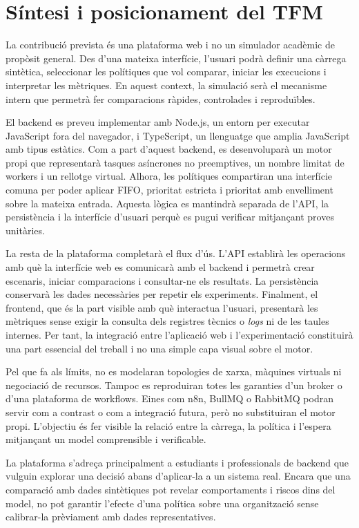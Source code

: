 \section{Síntesi i posicionament del TFM}

La contribució prevista és una plataforma web i no un simulador acadèmic de
propòsit general. Des d'una mateixa interfície, l'usuari podrà definir una
càrrega sintètica, seleccionar les polítiques que vol comparar, iniciar les
execucions i interpretar les mètriques. En aquest context, la simulació serà el
mecanisme intern que permetrà fer comparacions ràpides, controlades i
reproduïbles.

El backend es preveu implementar amb Node.js, un entorn per executar JavaScript
fora del navegador, i TypeScript, un llenguatge que amplia JavaScript amb tipus
estàtics. Com a part d'aquest backend, es desenvoluparà un motor propi que
representarà tasques asíncrones no preemptives, un nombre limitat de workers i
un rellotge virtual. Alhora, les polítiques compartiran una interfície comuna
per poder aplicar FIFO, prioritat estricta i prioritat amb envelliment sobre la
mateixa entrada. Aquesta lògica es mantindrà separada de l'API, la persistència
i la interfície d'usuari perquè es pugui verificar mitjançant proves unitàries.

La resta de la plataforma completarà el flux d'ús. L'API establirà les
operacions amb què la interfície web es comunicarà amb el backend i permetrà
crear escenaris, iniciar comparacions i consultar-ne els resultats. La
persistència conservarà les dades necessàries per repetir els experiments.
Finalment, el frontend, que és la part visible amb què interactua l'usuari,
presentarà les mètriques sense exigir la consulta dels registres tècnics o
\emph{logs} ni de les taules internes. Per tant, la integració entre l'aplicació
web i l'experimentació constituirà una part essencial del treball i no una
simple capa visual sobre el motor.

Pel que fa als límits, no es modelaran topologies de xarxa, màquines virtuals ni
negociació de recursos. Tampoc es reproduiran totes les garanties d'un broker o
d'una plataforma de workflows. Eines com n8n, BullMQ o RabbitMQ podran servir
com a contrast o com a integració futura, però no substituiran el motor propi.
L'objectiu és fer visible la relació entre la càrrega, la política i l'espera
mitjançant un model comprensible i verificable.

La plataforma s'adreça principalment a estudiants i professionals de backend
que vulguin explorar una decisió abans d'aplicar-la a un sistema real. Encara
que una comparació amb dades sintètiques pot revelar comportaments i riscos
dins del model, no pot garantir l'efecte d'una política sobre una organització
sense calibrar-la prèviament amb dades representatives.
